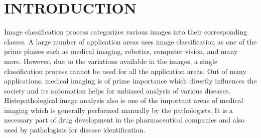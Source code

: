 

\chapter{INTRODUCTION}\label{Ch1:Introduction}
\graphicspath{{Chapter1/Chapter1Figs/}{Chapter1/Chapter1Figs/}}

Image classification process categorizes various images into their corresponding classes. A large number of application areas uses image classification as one of the prime phases such as medical imaging, robotics, computer vision, and many more. However, due to the variations available in the images, a single classification process cannot be used for all the application areas. Out of many applications, medical imaging is of prime importance which directly influences the society and its automation helps for unbiased analysis of various diseases. Histopathological image analysis also is one of the important areas of medical imaging which is generally performed manually by the pathologists. It is a necessary part of  drug development in the pharmaceutical companies and also used by pathologists for disease identification.

